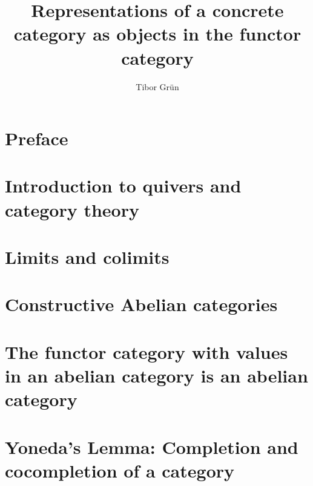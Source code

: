 \documentclass{article}
\title{Representations of a concrete category as objects in the functor category}
\author{Tibor Gr{\"u}n}
\begin{document}

	\maketitle

	\newpage

	\tableofcontents\label{toc}
	
	\newpage

	
\section{Preface}

\section{Introduction to quivers and category theory}


\section{Limits and colimits}



\section{Constructive Abelian categories}


\section{The functor category with values in an abelian category is an abelian category}


\section{Yoneda's Lemma: Completion and cocompletion of a category}


\end{document}

